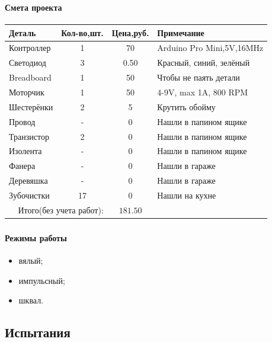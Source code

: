 \begin{frame}
    \frametitle{\myDevice}
    \framesubtitle{Смета проекта}
    
    \begin{center}
        \begin{tabular}{l|c|c|l}
            \hline\hline
            Деталь & Кол-во,шт. & Цена,руб. & Примечание \\
            \hline\hline
            Контроллер & 1  & 70   & Arduino Pro Mini,5V,16MHz\\
            Светодиод  & 3  & 0.50 & Красный, синий, зелёный\\
            Breadboard & 1  & 50   & Чтобы не паять детали\\
            Моторчик   & 1  & 50   & 4-9V, max 1A, 800 RPM\\
            Шестерёнки & 2  & 5    & Крутить обойму\\
            Провод     & -  & 0    & Нашли в папином ящике\\
            Транзистор & 2  & 0    & Нашли в папином ящике\\
            Изолента   & -  & 0    & Нашли в папином ящике\\
            Фанера     & -  & 0    & Нашли в гараже\\
            Деревяшка  & -  & 0    & Нашли в гараже\\
            Зубочистки & 17 & 0    & Нашли на кухне\\ \hline
            \multicolumn{2}{r|}{Итого(\alert{без учета работ}):} & \multicolumn{1}{c}{\alert{$181.50$}} & \\
        \end{tabular}
    \end{center}
\end{frame}

\begin{frame}
    \frametitle{\myDevice}
    \framesubtitle{Режимы работы}
    
    \begin{itemize}
        \item вялый;
        \item импульсный;
        \item шквал.
    \end{itemize}    
\end{frame}


\subsection{Испытания \myDevice}


